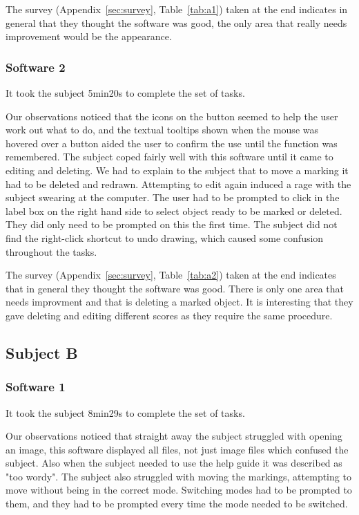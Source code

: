 \documentclass[a4paper,11pt,oneside]{article}
\begin{document}
The survey (Appendix~\ref{sec:survey}, Table~\ref{tab:a1}) taken at the end indicates in general that they thought the software was good, the only area that really needs improvement would be the appearance.

\subsubsection{Software 2}
It took the subject 5min20s to complete the set of tasks.

Our observations noticed that the icons on the button seemed to help the user work out what to do, and the textual tooltips shown when the mouse was hovered over a button aided the user to confirm the use until the function was remembered.  The subject coped fairly well with this software until it came to editing and deleting.  We had to explain to the subject that to move a marking it had to be deleted and redrawn.  Attempting to edit again induced a rage with the subject swearing at the computer.  The user had to be prompted to click in the label box on the right hand side to select object ready to be marked or deleted.  They did only need to be prompted on this the first time. The subject did not find the right-click shortcut to undo drawing, which caused some confusion throughout the tasks.

The survey (Appendix~\ref{sec:survey}, Table~\ref{tab:a2}) taken at the end indicates that in general they thought the software was good.  There is only one area that needs improvment and that is deleting a marked object.  It is interesting that they gave deleting and editing different scores as they require the same procedure.

\subsection{Subject B}
\subsubsection{Software 1}
It took the subject 8min29s to complete the set of tasks.

Our observations noticed that straight away the subject struggled with opening an image, this software displayed all files, not just image files which confused the subject.  Also when the subject needed to use the help guide it was described as "too wordy".  The subject also struggled with moving the markings, attempting to move without being in the correct mode.  Switching modes had to be prompted to them, and they had to be prompted every time the mode needed to be switched.
\end{document}
